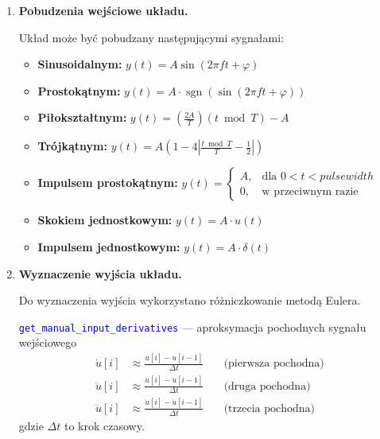 \documentclass[10pt, a4paper]{article}
\begin{document}
\begin{enumerate}[label=\alph*.]
  \vspace{0.2cm}
  
  \item \textbf{Pobudzenia wejściowe układu.} \par\vspace{0.1cm}
  Układ może być pobudzany następującymi sygnałami: 
  \begin{itemize}
  \item \textbf{Sinusoidalnym:} \( y(t) = A \sin(2\pi f t + \varphi) \)
  \item \textbf{Prostokątnym:} \( y(t) = A \cdot \operatorname{sgn}\left( \sin(2\pi f t + \varphi) \right) \)
  \item \textbf{Piłokształtnym:} \( y(t) = \left( \frac{2A}{T} \right) (t \bmod T) - A \)
  \item \textbf{Trójkątnym:} \(y(t) = A \left(1 - 4 \left| \frac{t \bmod T}{T} - \frac{1}{2} \right| \right)\)
  \item \textbf{Impulsem prostokątnym:} \( y(t) = 
  \begin{cases}
  A, & \text{dla } 0 < t < pulse width \\
  0, & \text{w przeciwnym razie}
  \end{cases}
  \)
  \item \textbf{Skokiem jednostkowym:} \( y(t) = A \cdot u(t) \)
  \item \textbf{Impulsem jednostkowym:} \(y(t) = A \cdot \delta(t)\)
\end{itemize}

\vspace{0.2cm}
  
  \item \textbf{Wyznaczenie wyjścia układu.} \par\vspace{0.1cm}
  Do wyznaczenia wyjścia wykorzystano różniczkowanie metodą Eulera. 

  \vspace{0.1cm}

  \textcolor{blue}{\texttt{get\_manual\_input\_derivatives}} --- aproksymacja pochodnych sygnału wejściowego 
  \[
\begin{aligned}
\dot{u}[i] &\approx \frac{u[i] - u[i-1]}{\Delta t} \quad &\text{(pierwsza pochodna)} \\
\ddot{u}[i] &\approx \frac{\dot{u}[i] - \dot{u}[i-1]}{\Delta t} \quad &\text{(druga pochodna)} \\
\dddot{u}[i] &\approx \frac{\ddot{u}[i] - \ddot{u}[i-1]}{\Delta t} \quad &\text{(trzecia pochodna)}
\end{aligned}
\]
\noindent gdzie \( \Delta t \) to krok czasowy.


\end{enumerate}
\end{document}
